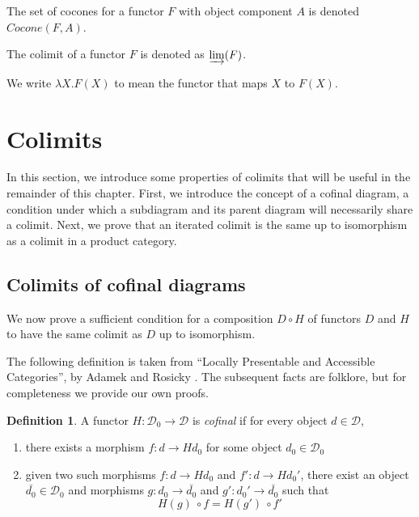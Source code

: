 \documentclass{msthesis}
\theoremstyle{definition}
\newtheorem{definition}[theorem]{Definition}
\newcommand{\mcC}{\mathcal{C}}
\newcommand{\mcD}{\mathcal{D}}
\newcommand{\mcDo}{\mathcal{D}_0}
\newcommand{\colim}{\varinjlim}
\begin{document}
The set of cocones for a functor $F$ with object component $A$ is denoted $Cocone(F, A)$.

The colimit of a functor $F$ is denoted as $\colim(F)$.  


We write $\lambda X.F(X)$ to mean the functor that maps $X$ to $F(X)$.
\newpage

\section{Colimits}

In this section, we introduce some properties of colimits that will be useful in the remainder of this chapter.  First, we introduce the concept of a cofinal diagram, a condition under which a subdiagram and its parent diagram will necessarily share a colimit.  Next, we prove that an iterated colimit is the same up to isomorphism as a colimit in a product category.

\subsection{Colimits of cofinal diagrams}

We now prove a sufficient condition for a composition $D \circ H$ of functors $D$ and $H$ to have the same colimit as $D$ up to isomorphism.

The following definition is taken from ``Locally Presentable and Accessible Categories'', by Adamek and Rosicky \cite{Adamek_Rosicky_1994}. The subsequent facts are folklore, but for completeness we provide our own proofs.

\begin{definition}\label{def:cofinal}
    A functor $H : \mcDo \to \mcD$ is \emph{cofinal} if for every object $d \in \mcD$,

    \begin{enumerate}[label=(\alph*),nosep]
        \item there exists a morphism $f : d \to H d_0$ for some object $d_0 \in \mcDo$
        \item given two such morphisms $f : d \to H d_0$ and $f' : d \to H d_0'$, there exist an object $\bar{d_0} \in \mcDo$ and morphisms $g : d_0 \to \bar{d_0}$ and $g' : d_0' \to \bar{d_0}$ such that
        \[ H(g)\ \circ f = H(g')\ \circ f' \]
    \end{enumerate}
\end{definition}
\end{document}
